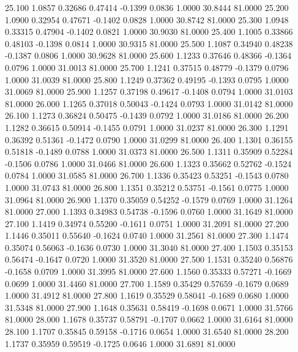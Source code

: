   25.100   1.0857   0.32686   0.47414  -0.1399   0.0836   1.0000  30.8444  81.0000
  25.200   1.0900   0.32954   0.47671  -0.1402   0.0828   1.0000  30.8742  81.0000
  25.300   1.0948   0.33315   0.47904  -0.1402   0.0821   1.0000  30.9030  81.0000
  25.400   1.1005   0.33866   0.48103  -0.1398   0.0814   1.0000  30.9315  81.0000
  25.500   1.1087   0.34940   0.48238  -0.1387   0.0806   1.0000  30.9628  81.0000
  25.600   1.1233   0.37646   0.48366  -0.1364   0.0796   1.0000  31.0013  81.0000
  25.700   1.1241   0.37515   0.48779  -0.1379   0.0796   1.0000  31.0039  81.0000
  25.800   1.1249   0.37362   0.49195  -0.1393   0.0795   1.0000  31.0069  81.0000
  25.900   1.1257   0.37198   0.49617  -0.1408   0.0794   1.0000  31.0103  81.0000
  26.000   1.1265   0.37018   0.50043  -0.1424   0.0793   1.0000  31.0142  81.0000
  26.100   1.1273   0.36824   0.50475  -0.1439   0.0792   1.0000  31.0186  81.0000
  26.200   1.1282   0.36615   0.50914  -0.1455   0.0791   1.0000  31.0237  81.0000
  26.300   1.1291   0.36392   0.51361  -0.1472   0.0790   1.0000  31.0299  81.0000
  26.400   1.1301   0.36155   0.51818  -0.1489   0.0788   1.0000  31.0373  81.0000
  26.500   1.1311   0.35909   0.52284  -0.1506   0.0786   1.0000  31.0466  81.0000
  26.600   1.1323   0.35662   0.52762  -0.1524   0.0784   1.0000  31.0585  81.0000
  26.700   1.1336   0.35423   0.53251  -0.1543   0.0780   1.0000  31.0743  81.0000
  26.800   1.1351   0.35212   0.53751  -0.1561   0.0775   1.0000  31.0964  81.0000
  26.900   1.1370   0.35059   0.54252  -0.1579   0.0769   1.0000  31.1264  81.0000
  27.000   1.1393   0.34983   0.54738  -0.1596   0.0760   1.0000  31.1649  81.0000
  27.100   1.1419   0.34974   0.55200  -0.1611   0.0751   1.0000  31.2091  81.0000
  27.200   1.1446   0.35011   0.55640  -0.1624   0.0740   1.0000  31.2561  81.0000
  27.300   1.1474   0.35074   0.56063  -0.1636   0.0730   1.0000  31.3040  81.0000
  27.400   1.1503   0.35153   0.56474  -0.1647   0.0720   1.0000  31.3520  81.0000
  27.500   1.1531   0.35240   0.56876  -0.1658   0.0709   1.0000  31.3995  81.0000
  27.600   1.1560   0.35333   0.57271  -0.1669   0.0699   1.0000  31.4460  81.0000
  27.700   1.1589   0.35429   0.57659  -0.1679   0.0689   1.0000  31.4912  81.0000
  27.800   1.1619   0.35529   0.58041  -0.1689   0.0680   1.0000  31.5348  81.0000
  27.900   1.1648   0.35631   0.58419  -0.1698   0.0671   1.0000  31.5766  81.0000
  28.000   1.1678   0.35737   0.58791  -0.1707   0.0662   1.0000  31.6164  81.0000
  28.100   1.1707   0.35845   0.59158  -0.1716   0.0654   1.0000  31.6540  81.0000
  28.200   1.1737   0.35959   0.59519  -0.1725   0.0646   1.0000  31.6891  81.0000
